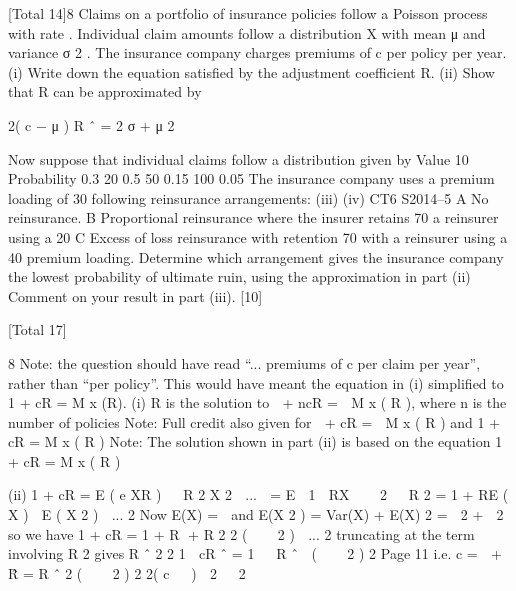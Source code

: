 \documentclass[a4paper,12pt]{article}
\begin{document}
\begin{enumerate}

[Total 14]8
Claims on a portfolio of insurance policies follow a Poisson process with rate \lambda.
Individual claim amounts follow a distribution X with mean μ and variance σ 2 . The
insurance company charges premiums of c per policy per year.
(i) Write down the equation satisfied by the adjustment coefficient R.
(ii) Show that R can be approximated by

2( c − μ )
R ˆ = 2
σ + μ 2

Now suppose that individual claims follow a distribution given by
Value
10
Probability 0.3
20
0.5
50
0.15
100
0.05
The insurance company uses a premium loading of 30%
following reinsurance arrangements:
(iii)
(iv)
CT6 S2014–5
A No reinsurance.
B Proportional reinsurance where the insurer retains 70%
a reinsurer using a 20%
C Excess of loss reinsurance with retention 70 with a reinsurer using a 40%
premium loading.
Determine which arrangement gives the insurance company the lowest
probability of ultimate ruin, using the approximation in part (ii)
Comment on your result in part (iii).
[10]

[Total 17]


8
Note: the question should have read “... premiums of c per claim per year”, rather
than “per policy”. This would have meant the equation in (i) simplified to
1 + cR = M x (R).
(i)
R is the solution to
 + ncR =  M x ( R ), where n is the number of policies
Note: Full credit also given for  + cR =  M x ( R ) and 1 + cR = M x ( R )
Note: The solution shown in part (ii) is based on the equation 1 + cR = M x ( R )

(ii)
1 + cR = E ( e XR )


R 2 X 2
 ... 
= E  1  RX 


2


R 2
= 1 + RE ( X ) 
E ( X 2 )  ...
2
Now E(X) = 
and E(X 2 ) = Var(X) + E(X) 2 =  2 +  2 so we have
1 + cR = 1 + R +
R 2 2
(    2 )  ...
2
truncating at the term involving R 2 gives
R ˆ 2 2
1  cR ˆ = 1   R ˆ 
(    2 )
2
Page 11%
i.e. c =  +
R̂ =
R ˆ 2
(    2 )
2
2( c   )
 2   2


\end{enumerate}
\end{document}
